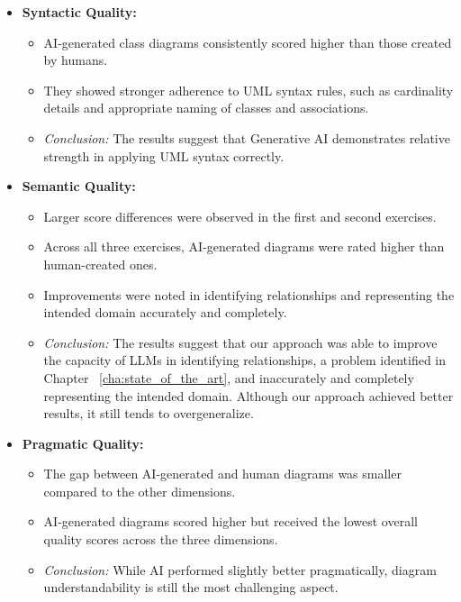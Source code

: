\begin{itemize}
    \item \textbf{Syntactic Quality:}  
    \begin{itemize}
        \item AI-generated class diagrams consistently scored higher than those created by humans.  
        \item They showed stronger adherence to UML syntax rules, such as cardinality details and appropriate naming of classes and associations.  
        \item \textit{Conclusion:} The results suggest that Generative AI demonstrates relative strength in applying UML syntax correctly.  
    \end{itemize}
    
    \item \textbf{Semantic Quality:}  
    \begin{itemize}
        \item Larger score differences were observed in the first and second exercises.  
        \item Across all three exercises, AI-generated diagrams were rated higher than human-created ones.  
        \item Improvements were noted in identifying relationships and representing the intended domain accurately and completely.  
        \item \textit{Conclusion:} The results suggest that our approach was able to improve the capacity of LLMs in identifying relationships, a problem identified in Chapter ~\ref{cha:state_of_the_art}, and inaccurately and completely representing the intended domain. 
        Although our approach achieved better results, it still tends to overgeneralize.
    \end{itemize}

    \item \textbf{Pragmatic Quality:}  
    \begin{itemize}
        \item The gap between AI-generated and human diagrams was smaller compared to the other dimensions.  
        \item AI-generated diagrams scored higher but received the lowest overall quality scores across the three dimensions.  
        \item \textit{Conclusion:} While AI performed slightly better pragmatically, diagram understandability is still the most challenging aspect.  
    \end{itemize}
\end{itemize}



